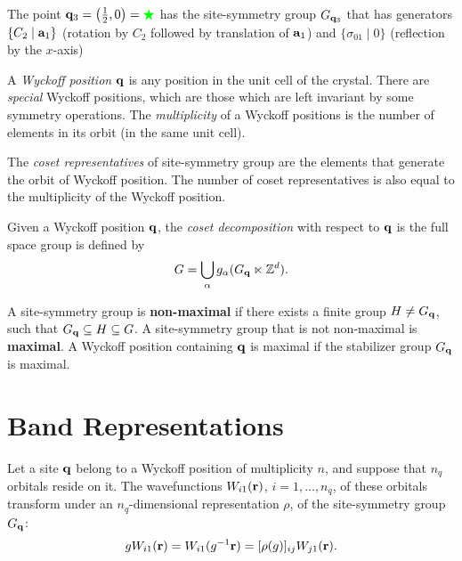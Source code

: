 \begin{example} \label{ex:site-symmetry_groups_p6mm}
The point ${\vb{q}}_3 = \qty(\frac{1}{2}, 0) = \textcolor{green}{\bigstar}$ has the site-symmetry group $G_{{\vb{q}}_3}$ that has generators $\{C_2 \mid {\vb{a}}_1\}$ (rotation by $C_2$ followed by translation of ${\vb{a}}_1$) and $\{\sigma_{01}\mid 0\}$ (reflection by the $x$-axis)
\end{example}

\begin{definition} \label{def:wyckpos}
A \textit{Wyckoff position} ${\vb{q}}$ is any position in the unit cell of the crystal. There are \textit{special} Wyckoff positions, which are those which are left invariant by some symmetry operations. The \textit{multiplicity} of a Wyckoff positions is the number of elements in its orbit (in the same unit cell).
\end{definition}

\begin{definition} \label{def:cosetrep}
The \textit{coset representatives} of site-symmetry group are the elements that generate the orbit of Wyckoff position. The number of coset representatives is also equal to the multiplicity of the Wyckoff position.
\end{definition}

\begin{definition} \label{def:cosetdecomp}
Given a Wyckoff position ${\vb{q}}$, the \textit{coset decomposition} with respect to ${\vb{q}}$ is the full space group is defined by
$$
G = \bigcup_\alpha g_\alpha (G_{{\vb{q}}} \ltimes {\mathbb{Z}}^d).
$$
\end{definition}

\begin{definition}
A site-symmetry group is \textbf{non-maximal} if there exists a finite group $H \neq G_{\vb{q}}$, such that $G_{\vb{q}} \subseteq H \subseteq G$. A site-symmetry group that is not non-maximal is \textbf{maximal}. A Wyckoff position containing ${\vb{q}}$ is maximal if the stabilizer group $G_{\vb{q}}$ is maximal.
\end{definition}

\section{Band Representations}

Let a site ${\vb{q}}$ belong to a Wyckoff position of multiplicity $n$, and suppose that $n_q$ orbitals reside on it. The wavefunctions $W_{i1}({\vb{r}})$, $i = 1, \ldots, n_q$, of these orbitals transform under an $n_q$-dimensional representation $\rho$, of the site-symmetry group $G_{\vb{q}}$:
$$
g W_{i1}({\vb{r}}) = W_{i1}(g^{-1} {\vb{r}}) = [\rho(g)]_{ij} W_{j1}({\vb{r}}).
$$

